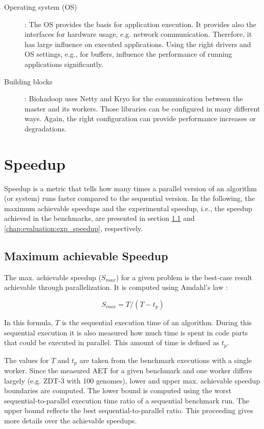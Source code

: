 \begin{description}
  \item [Operating system (OS)]: The OS provides the basis for application execution. It provides also the interfaces for hardware usage, e.g. network communication. Therefore, it has large influence on executed applications. Using the right drivers and OS settings, e.g., for buffers, influence the performance of running applications significantly.
  \item [Building blocks]: Biohadoop uses Netty and Kryo for the communication between the master and its workers. Those libraries can be configured in many different ways. Again, the right configuration can provide performance increases or degradations.
\end{description}

\section{Speedup}
\label{chap:evaluation:speedup}
Speedup is a metric that tells how many times a parallel version of an algorithm (or system) runs faster compared to the sequential version. In the following, the maximum achievable speedups and the experimental speedup, i.e., the speedup achieved in the benchmarks, are presented in section \ref{chap:evaluation:max_speedup} and \ref{chap:evaluation:exp_speedup}, respectively.

\subsection{Maximum achievable Speedup}
\label{chap:evaluation:max_speedup}
The max. achievable speedup ($S_{max}$) for a given problem is the best-case result achievable through parallelization. It is computed using Amdahl's law \cite{amdahl1967validity}:

\begin{equation}
S_{max} = T / (T - t_p)
\end{equation}

In this formula, $T$ is the sequential execution time of an algorithm. During this sequential execution it is also measured how much time is spent in code parts that could be executed in parallel. This amount of time is defined as $t_p$.

The values for $T$ and $t_p$ are taken from the benchmark executions with a single worker. Since the measured AET for a given benchmark and one worker differs largely (e.g. ZDT-3 with 100 genomes), lower and upper max. achievable speedup boundaries are computed. The lower bound is computed using the worst sequential-to-parallel execution time ratio of a sequential benchmark run. The upper bound reflects the best sequential-to-parallel ratio. This proceeding gives more details over the achievable speedups.

